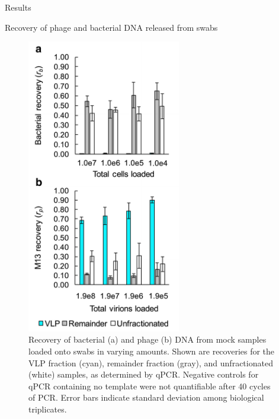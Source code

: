 \documentclass[oneside,12pt,final]{sty/ucthesis-CA2012}
\begin{document}
\begin{mainmatter}
\begin{section}{Results}
\begin{subsection}{Recovery of phage and bacterial DNA released from swabs}
\begin{figure}
\centerline{\includegraphics[width=0.6\textwidth]{fig/C2fig2AB.pdf}}
\caption{Recovery of bacterial (a) and phage (b) DNA from mock samples loaded onto swabs in varying amounts. Shown are recoveries for the VLP fraction (cyan), remainder fraction (gray), and unfractionated (white) samples, as determined by qPCR. Negative controls for qPCR containing no template were not quantifiable after 40 cycles of PCR. Error bars indicate standard deviation among biological triplicates.}
\label{fig:mockrec}
\end{figure}
\end{subsection}


\end{section}
\end{mainmatter}
\end{document}
